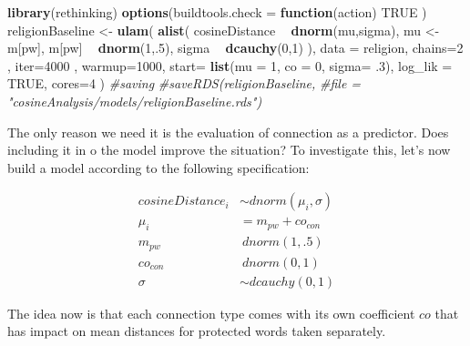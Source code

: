 \documentclass[]{book}
\newenvironment{Shaded}{\begin{snugshade}}{\end{snugshade}}
\newcommand{\KeywordTok}[1]{\textcolor[rgb]{0.13,0.29,0.53}{\textbf{#1}}}
\newcommand{\DataTypeTok}[1]{\textcolor[rgb]{0.13,0.29,0.53}{#1}}
\newcommand{\DecValTok}[1]{\textcolor[rgb]{0.00,0.00,0.81}{#1}}
\newcommand{\FloatTok}[1]{\textcolor[rgb]{0.00,0.00,0.81}{#1}}
\newcommand{\StringTok}[1]{\textcolor[rgb]{0.31,0.60,0.02}{#1}}
\newcommand{\CommentTok}[1]{\textcolor[rgb]{0.56,0.35,0.01}{\textit{#1}}}
\newcommand{\OtherTok}[1]{\textcolor[rgb]{0.56,0.35,0.01}{#1}}
\newcommand{\ControlFlowTok}[1]{\textcolor[rgb]{0.13,0.29,0.53}{\textbf{#1}}}
\newcommand{\OperatorTok}[1]{\textcolor[rgb]{0.81,0.36,0.00}{\textbf{#1}}}
\newcommand{\NormalTok}[1]{#1}
\begin{document}
\vspace{1mm} \footnotesize

\begin{Shaded}
\begin{Highlighting}[]
\KeywordTok{library}\NormalTok{(rethinking)}
\KeywordTok{options}\NormalTok{(}\DataTypeTok{buildtools.check =} \ControlFlowTok{function}\NormalTok{(action) }\OtherTok{TRUE}\NormalTok{ )}
\NormalTok{religionBaseline <-}\StringTok{ }\KeywordTok{ulam}\NormalTok{(}
  \KeywordTok{alist}\NormalTok{(}
\NormalTok{    cosineDistance }\OperatorTok{~}\StringTok{ }\KeywordTok{dnorm}\NormalTok{(mu,sigma),}
\NormalTok{    mu <-}\StringTok{ }\NormalTok{m[pw],}
\NormalTok{    m[pw] }\OperatorTok{~}\StringTok{ }\KeywordTok{dnorm}\NormalTok{(}\DecValTok{1}\NormalTok{,.}\DecValTok{5}\NormalTok{),}
\NormalTok{    sigma }\OperatorTok{~}\StringTok{ }\KeywordTok{dcauchy}\NormalTok{(}\DecValTok{0}\NormalTok{,}\DecValTok{1}\NormalTok{)}
\NormalTok{  ),}
  \DataTypeTok{data =}\NormalTok{ religion,}
  \DataTypeTok{chains=}\DecValTok{2}\NormalTok{ , }\DataTypeTok{iter=}\DecValTok{4000}\NormalTok{ , }\DataTypeTok{warmup=}\DecValTok{1000}\NormalTok{,}
  \DataTypeTok{start=} \KeywordTok{list}\NormalTok{(}\DataTypeTok{mu =} \DecValTok{1}\NormalTok{, }\DataTypeTok{co =} \DecValTok{0}\NormalTok{, }\DataTypeTok{sigma=} \FloatTok{.3}\NormalTok{),}
  \DataTypeTok{log_lik =} \OtherTok{TRUE}\NormalTok{, }\DataTypeTok{cores=}\DecValTok{4}
\NormalTok{)}
\CommentTok{#saving}
\CommentTok{#saveRDS(religionBaseline, }
\CommentTok{#file = "cosineAnalysis/models/religionBaseline.rds")}
\end{Highlighting}
\end{Shaded}

The only reason we need it is the evaluation of connection as a
predictor. Does including it in o the model improve the situation? To
investigate this, let's now build a model according to the following
specification:

\begin{align}
cosineDistance_i  & \sim dnorm(\mu_i, \sigma) \\
\mu_i & = m_{pw} + co_{con}\\
m_{pw} & ~ dnorm(1,.5) \\
co_{con} & ~ dnorm(0,1) \\
\sigma &\sim  dcauchy(0,1)
\end{align}

\noindent The idea now is that each connection type comes with its own
coefficient \(co\) that has impact on mean distances for protected words
taken separately.
\end{document}
